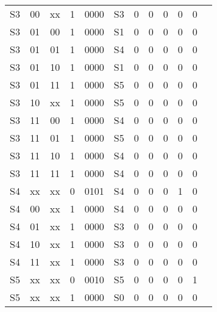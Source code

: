 \begin{table}[H]
\begin{tabular}{|c|c|c|c|c|c|c|c|c|c|c|c|}
		S3 		& 00 	 & xx 	  & 1		& 0000	 & S3      & 0     	     & 0 	      & 0	  & 0    & 0 	 	\\
		S3 		& 01 	 & 00 	  & 1		& 0000	 & S1      & 0     	     & 0 	      & 0	  & 0    & 0 	 	\\
		S3 		& 01 	 & 01 	  & 1		& 0000	 & S4      & 0     	     & 0 	      & 0	  & 0    & 0 	 	\\
		S3 		& 01 	 & 10 	  & 1		& 0000	 & S1      & 0     	     & 0 	      & 0	  & 0    & 0 	 	\\
		S3 		& 01 	 & 11 	  & 1		& 0000	 & S5      & 0     	     & 0 	      & 0	  & 0    & 0 	 	\\		
		S3 		& 10 	 & xx 	  & 1		& 0000	 & S5      & 0     	     & 0 	      & 0	  & 0    & 0 	 	\\
		S3 		& 11 	 & 00 	  & 1		& 0000	 & S4      & 0     	     & 0 	      & 0	  & 0    & 0 	 	\\
		S3 		& 11 	 & 01 	  & 1		& 0000	 & S5      & 0     	     & 0 	      & 0	  & 0    & 0 	 	\\
		S3 		& 11 	 & 10 	  & 1		& 0000	 & S4      & 0     	     & 0 	      & 0	  & 0    & 0 	 	\\
		S3 		& 11 	 & 11 	  & 1		& 0000	 & S4      & 0     	     & 0 	      & 0	  & 0    & 0 	 	\\
		\hline
		S4 		& xx 	 & xx 	  & 0		& 0101	 & S4      & 0     	     & 0 	      & 0	  & 1    & 0 	 	\\
		S4 		& 00 	 & xx 	  & 1		& 0000	 & S4      & 0     	     & 0 	      & 0	  & 0    & 0 	 	\\
		S4 		& 01 	 & xx 	  & 1		& 0000	 & S3      & 0     	     & 0 	      & 0	  & 0    & 0 	 	\\
		S4 		& 10 	 & xx 	  & 1		& 0000	 & S3      & 0     	     & 0 	      & 0	  & 0    & 0 	 	\\
		S4 		& 11 	 & xx 	  & 1		& 0000	 & S3      & 0     	     & 0 	      & 0	  & 0    & 0 	 	\\
		\hline
		S5 		& xx 	 & xx 	  & 0		& 0010	 & S5      & 0     	     & 0 	      & 0	  & 0    & 1 	 	\\
		S5 		& xx 	 & xx 	  & 1		& 0000	 & S0      & 0     	     & 0 	      & 0	  & 0    & 0 	 	\\
		\hline
		
    \end{tabular}
    \label{tab.estados}
\end{table}	
\normalsize



